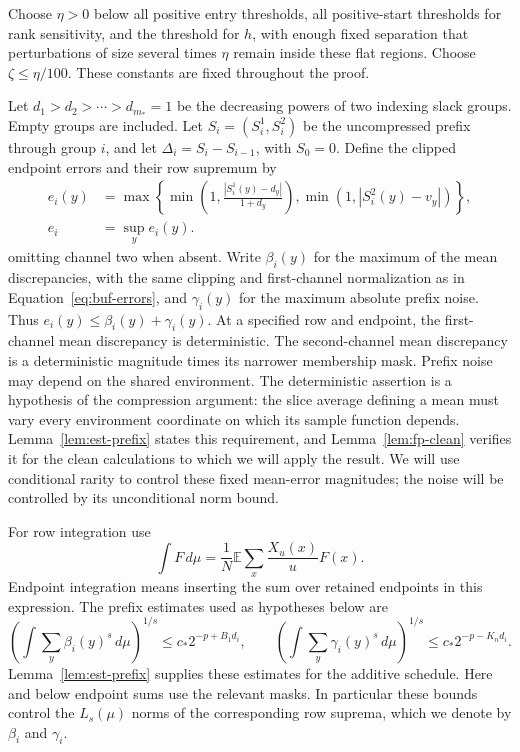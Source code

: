 Choose $\eta>0$ below all positive entry thresholds, all positive-start
thresholds for rank sensitivity, and the threshold for $h$, with enough
fixed separation that perturbations of size several times $\eta$ remain
inside these flat regions.  Choose $\zeta\leq\eta/100$.  These constants are
fixed throughout the proof.

Let $d_1>d_2>\cdots>d_{m_*}=1$ be the decreasing powers of two indexing
slack groups.  Empty groups are included.  Let $S_i=(S_i^1,S_i^2)$ be the
uncompressed prefix through group $i$, and let
$\Delta_i=S_i-S_{i-1}$, with $S_0=0$.  Define the clipped endpoint errors
and their row supremum by
\begin{equation}
 \begin{aligned}
 e_i(y)&=\max\left\{
 \min\left(1,\frac{|S_i^1(y)-d_y|}{1+d_y}\right),
 \min(1,|S_i^2(y)-v_y|)\right\},\\
 e_i&=\sup_y e_i(y).
 \end{aligned}
 \label{eq:buf-errors}
\end{equation}
omitting channel two when absent.  Write $\beta_i(y)$ for the maximum of
the mean discrepancies, with the same clipping and first-channel
normalization as in Equation~\eqref{eq:buf-errors}, and $\gamma_i(y)$ for
the maximum absolute prefix noise.  Thus
$e_i(y)\leq\beta_i(y)+\gamma_i(y)$.  At a specified row and endpoint, the
first-channel mean discrepancy is deterministic.  The second-channel mean
discrepancy is a deterministic magnitude times its narrower membership
mask.  Prefix noise may depend on the shared environment.
The deterministic assertion is a hypothesis of the compression argument:
the slice average defining a mean must vary every environment coordinate
on which its sample function depends.  Lemma~\ref{lem:est-prefix} states
this requirement, and Lemma~\ref{lem:fp-clean} verifies it for the clean
calculations to which we will apply the result.  We will use conditional
rarity to control these fixed mean-error magnitudes; the noise will be
controlled by its unconditional norm bound.

For row integration use
\[
 \int F\,d\mu=\frac1N\mathbb E\sum_x\frac{X_u(x)}u F(x).
\]
Endpoint integration means inserting the sum over retained endpoints in
this expression.  The prefix estimates used as hypotheses below are
\begin{equation}
 \left(\int\sum_y\beta_i(y)^s\,d\mu\right)^{1/s}
       \leq c_*2^{-p+B_1d_i},\qquad
 \left(\int\sum_y\gamma_i(y)^s\,d\mu\right)^{1/s}
       \leq c_*2^{-p-K_nd_i}.
 \label{eq:buf-prefix-interface}
\end{equation}
Lemma~\ref{lem:est-prefix} supplies these estimates for the additive
schedule.  Here and below endpoint sums use the relevant masks.  In
particular these bounds control the $L_s(\mu)$ norms of the corresponding
row suprema, which we denote by $\beta_i$ and $\gamma_i$.

